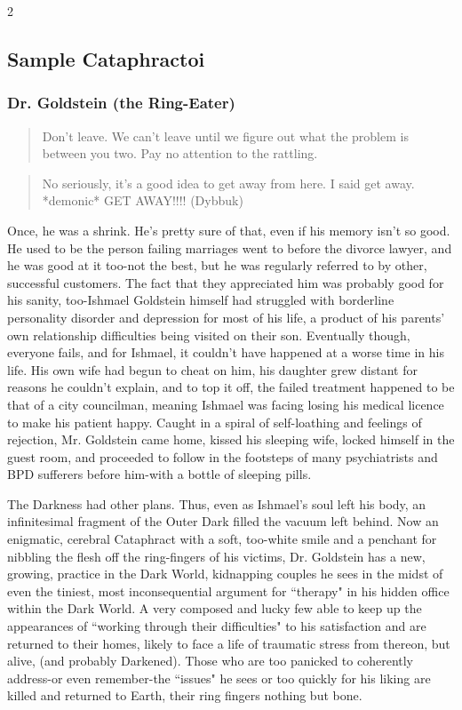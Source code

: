 \begin{multicols}{2}
\subsection*{Sample Cataphractoi}
\label{subsec:SampleCataphractoi}

\subsubsection*{Dr. Goldstein (the Ring-Eater)}

\begin{quote}Don't leave. We can't leave until we figure out what the problem is between you two. Pay no attention to the rattling. \end{quote}

\begin{quote}No seriously, it's a good idea to get away from here. I said get away. *demonic* GET AWAY!!!! (Dybbuk)\end{quote}

Once, he was a shrink. He's pretty sure of that, even if his memory isn't so good. He used to be the person failing marriages went to before the divorce lawyer, and he was good at it too-not the best, but he was regularly referred to by other, successful customers. The fact that they appreciated him was probably good for his sanity, too-Ishmael Goldstein himself had struggled with borderline personality disorder and depression for most of his life, a product of his parents' own relationship difficulties being visited on their son. Eventually though, everyone fails, and for Ishmael, it couldn't have happened at a worse time in his life. His own wife had begun to cheat on him, his daughter grew distant for reasons he couldn't explain, and to top it off, the failed treatment happened to be that of a city councilman, meaning Ishmael was facing losing his medical licence to make his patient happy. Caught in a spiral of self-loathing and feelings of rejection, Mr. Goldstein came home, kissed his sleeping wife, 
locked himself in the guest room, and proceeded to follow in the footsteps of many psychiatrists and BPD sufferers before him-with a bottle of sleeping pills.

The Darkness had other plans. Thus, even as Ishmael's soul left his body, an infinitesimal fragment of the Outer Dark filled the vacuum left behind. Now an enigmatic, cerebral Cataphract with a soft, too-white smile and a penchant for nibbling the flesh off the ring-fingers of his victims, Dr. Goldstein has a new, growing, practice in the Dark World, kidnapping couples he sees in the midst of even the tiniest, most inconsequential argument for \textquotedblleft therapy" in his hidden office within the Dark World. A very composed and lucky few able to keep up the appearances of \textquotedblleft working through their difficulties" to his satisfaction and are returned to their homes, likely to face a life of traumatic stress from thereon, but alive, (and probably Darkened). Those who are too panicked to coherently address-or even remember-the \textquotedblleft issues" he sees or too quickly for his liking are killed and returned to Earth, their ring fingers nothing but bone.


\end{multicols}
